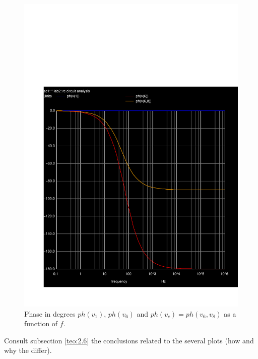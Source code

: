  \begin{figure}[h]
     \centering
         \includegraphics[scale = 0.55]{acp.pdf}
         \caption{Phase in degrees $ph(v_1)$, $ph(v_6)$ and $ph(v_c)=ph(v_6,v_8)$ as a function of $f$.}
     \label{acp}
 \end{figure}
 
\vspace{3mm}
\par Consult subsection \ref{teo:2.6} the conclusions related to the several plots (how and why the differ).

\newpage

